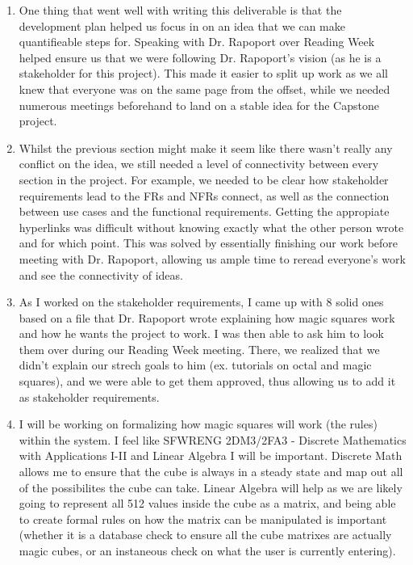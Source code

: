 \documentclass[12pt]{article}
\begin{document}
\begin{enumerate}
  \item One thing that went well with writing this deliverable is that the development plan helped us focus in on an 
  idea that we can make quantifieable steps for. Speaking with Dr. Rapoport over Reading Week helped ensure us that
  we were following Dr. Rapoport's vision (as he is a stakeholder for this project). This made it easier to split up work
  as we all knew that everyone was on the same page from the offset, while we needed numerous meetings beforehand to land
  on a stable idea for the Capstone project.
  \item Whilst the previous section might make it seem like there wasn't really any conflict on the idea, we still needed
  a level of connectivity between every section in the project. For example, we needed to be clear how stakeholder requirements
  lead to the FRs and NFRs connect, as well as the connection between use cases and the functional requirements. Getting the 
  appropiate hyperlinks was difficult without knowing exactly what the other person wrote and for which point. This was solved
  by essentially finishing our work before meeting with Dr. Rapoport, allowing us ample time to reread everyone's work and see
  the connectivity of ideas.
  \item As I worked on the stakeholder requirements, I came up with 8 solid ones based on a file that Dr. Rapoport wrote explaining
  how magic squares work and how he wants the project to work. I was then able to ask him to look them over during our Reading Week meeting.
  There, we realized that we didn't explain our strech goals to him (ex. tutorials on octal and magic squares), and we were able to get them
  approved, thus allowing us to add it as stakeholder requirements.
  \item I will be working on formalizing how magic squares will work (the rules) within the system. I feel like SFWRENG 2DM3/2FA3 - Discrete Mathematics with Applications I-II
  and Linear Algebra I will be important. Discrete Math allows me to ensure that the cube is always in a steady state and map out all of the possibilites the cube can take. 
  Linear Algebra will help as we are likely going to represent all 512 values inside the cube as a matrix, and being able to create formal rules on how the matrix can be 
  manipulated is important (whether it is a database check to ensure all the cube matrixes are actually magic cubes, or an instaneous check on what the user is currently entering).
\end{enumerate}
\end{document}
